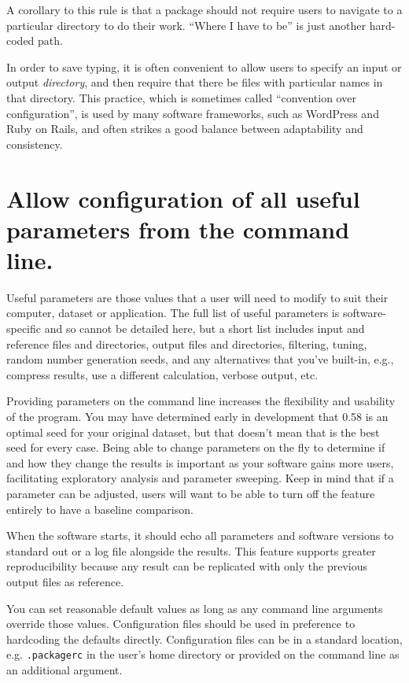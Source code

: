 \documentclass[10pt,letterpaper]{article}
\begin{document}
A corollary to this rule is that a package should not require users to
navigate to a particular directory to do their work. ``Where I have to
be'' is just another hard-coded path.

In order to save typing, it is often convenient to allow users to
specify an input or output \emph{directory}, and then require that there
be files with particular names in that directory. This practice, which
is sometimes called ``convention over configuration'', is used by many
software frameworks, such as WordPress and Ruby on Rails, and often
strikes a good balance between adaptability and consistency.

\section{Allow configuration of all useful parameters from the command line.}

Useful parameters are those values that a user will need to modify to suit
their computer, dataset or application. 
The full list of useful parameters is software-specific and so cannot be
detailed here, but a short list includes
input and reference files and directories,
output files and directories,
filtering,
tuning,
random number generation seeds,
and
any alternatives that you've built-in,
e.g.,
compress results, use a different calculation, verbose output, etc.

Providing parameters on the
command line increases the flexibility and usability of the program. You
may have determined early in development that 0.58 is an optimal seed for your
original dataset, but that doesn't mean that is the best seed for every
case. Being able to change parameters on the fly to determine if and how
they change the results is important as your software gains more users,
facilitating exploratory analysis and parameter sweeping. Keep in mind
that if a parameter can be adjusted, users will want to be able to turn
off the feature entirely to have a baseline comparison.

When the software starts, it should echo all parameters and software
versions to standard out or a log file alongside the results. This
feature supports greater reproducibility because any result can be
replicated with only the previous output files as reference.

You can set reasonable default values
as long as any command line arguments
override those values. Configuration files should be used in preference
to hardcoding the defaults directly. Configuration files can be in a standard
location, e.g. \texttt{.packagerc} in the user's home directory or
provided on the command line as an additional argument.
\end{document}
